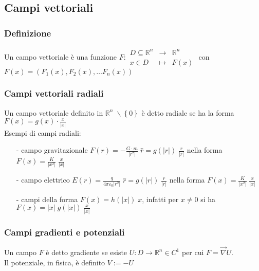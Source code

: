 \documentclass[a4paper]{article}
\newcommand\Rn{\mathbb{R}^n}  %
\newcommand\nab{\vec{\nabla}} %
\begin{document}
\newpage

\subsection{Campi vettoriali}
\subsubsection*{Definizione}
Un campo vettoriale è una funzione \(F : \begin{matrix}
	D \subseteq \Rn & \to & \Rn \\
	x \in D & \mapsto & F(x)
\end{matrix}\) con \(F(x) = (F_1(x), F_2(x), \dots F_n(x))\)

\subsubsection*{Campi vettoriali radiali}
Un campo vettoriale definito in \(\Rn \; \backslash \left\{0\right\}\) è detto radiale se ha la forma \(\displaystyle F(x) = g(x) \cdot \frac{x}{\left|x\right|}\) \\
Esempi di campi radiali:
\begin{itemize}[topsep=3pt, itemsep=0pt]
	\item[-] campo gravitazionale \(\displaystyle F(r) = -\frac{G \cdot m}{\left|r^2\right|} \; \hat{r} = g(\left|r\right|) \; \frac{r}{\left|r\right|}\) nella forma \(\displaystyle F(x) = \frac{K}{\left|x^2\right|} \; \frac{x}{\left|x\right|}\)
	\item[-] campo elettrico \(\displaystyle E(r) = \frac{q}{4 \pi \varepsilon_0 \left|r^2\right|} \; \hat{r} = g(\left|r\right|) \; \frac{r}{\left|r\right|}\) nella forma \(\displaystyle F(x) = \frac{K}{\left|x^2\right|} \; \frac{x}{\left|x\right|}\)
	\item[-] campi della forma \(F(x) = h(\left|x\right|) \; x\), infatti per \(x \neq 0\) si ha \(\displaystyle F(x) = \left|x\right| \; g(\left|x\right|) \; \frac{x}{\left|x\right|}\)
\end{itemize}

\subsubsection*{Campi gradienti e potenziali}
Un campo \(F\) è detto gradiente se esiste \(U:D \to \Rn \in C^1\) per cui \(F = \nab U\). \\
Il potenziale, in fisica, è definito \(V := -U\)
\end{document}

